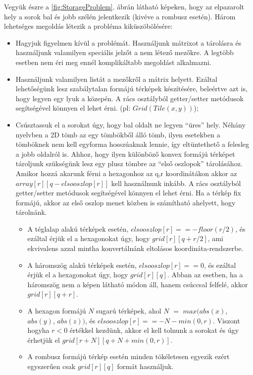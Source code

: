 \noindent Vegyük észre a \ref{fig:StorageProblem}. ábrán látható képeken, hogy az elpazarolt hely a sorok bal és jobb szélén jelentkezik (kivéve a rombusz esetén). Három lehetséges megoldás létezik a probléma kiküszöbölésére:
\begin{itemize}
\item Hagyjuk figyelmen kívül a problémát. Használjunk mátrixot a tárolásra és használjunk valamilyen speciális jelzőt a nem létező mezőkre. A legtöbb esetben nem éri meg ennél komplikáltabb megoldást alkalmazni.
\item Használjunk valamilyen listát a mezőkről a mátrix helyett. Ezáltal lehetőségünk lesz szabálytalan formájú térképek készítésére, beleértve azt is, hogy legyen egy lyuk a közepén. A rács osztályból getter/setter metódusok segítségével könnyen el lehet érni. (pl: $Grid(Tile(x,y))$);
\item Csúsztassuk el a sorokat úgy, hogy bal oldalt ne legyen “üres” hely. Néhány nyelvben a 2D tömb az egy tömbökből álló tömb, ilyen esetekben a tömböknek nem kell egyforma hosszúaknak lennie, így eltüntethető a felesleg a jobb oldalról is.
\newline
\newline Ahhoz, hogy ilyen különböző konvex formájú térképet tároljunk szükségünk lesz egy plusz tömbre az “első oszlopok” tárolásához. Amikor hozzá akarunk férni a hexagonhoz az q,r koordinátákon akkor az $array[r][q - elsooszlop[r]]$ kell használnunk inkább. A rács osztályból getter/setter metódusok segítségével könnyen el lehet érni.
\newline
\newline Ha a térkép fix formájú, akkor az első oszlop menet közben is számítható ahelyett, hogy tárolnánk.
\begin{itemize}
\item A téglalap alakú térképek esetén, $elsooszlop[r] == -floor(r/2)$, és ezáltal érjük el a hexagonokat úgy, hogy $grid[r][q + r/2]$, ami ekvivalens azzal mintha konvertálnánk eltolásos koordináta-rendszerbe.
\item A háromszög alakú térképek esetén, $elsooszlop[r] == 0$, és ezáltal érjük el a hexagonokat úgy, hogy $grid[r][q]$. Abban az esetben, ha a háromszög nem a képen látható módon áll, hanem csúccsal felfelé, akkor $grid[r][q + r]$.
\item A hexagon formájú $N$ sugarú térképek, ahol $N$ $=$ $max(abs(x)$, $abs(y)$, $abs(z))$, és $elsooszlop[r] == -N - min(0, r)$. Viszont hogyha $r < 0$ értékkel kezdünk, akkor el kell tolnunk a sorokat és úgy érhetjük el $grid[r + N][q + N + min(0, r)]$.
\item A rombusz formájú térkép esetén minden tökéletesen egyezik ezért egyszerűen csak $grid[r][q]$ formát használjuk.
\end{itemize}
\end{itemize}

